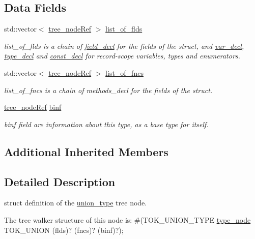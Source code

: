 \subsection*{Data Fields}
\begin{DoxyCompactItemize}
\item 
std\+::vector$<$ \hyperlink{tree__node_8hpp_a6ee377554d1c4871ad66a337eaa67fd5}{tree\+\_\+node\+Ref} $>$ \hyperlink{structunion__type_afc9fabf0aa1ebfbcf0a4d10b7c5c61f0}{list\+\_\+of\+\_\+flds}
\begin{DoxyCompactList}\small\item\em list\+\_\+of\+\_\+flds is a chain of \hyperlink{structfield__decl}{field\+\_\+decl} for the fields of the struct, and \hyperlink{structvar__decl}{var\+\_\+decl}, \hyperlink{structtype__decl}{type\+\_\+decl} and \hyperlink{structconst__decl}{const\+\_\+decl} for record-\/scope variables, types and enumerators. \end{DoxyCompactList}\item 
std\+::vector$<$ \hyperlink{tree__node_8hpp_a6ee377554d1c4871ad66a337eaa67fd5}{tree\+\_\+node\+Ref} $>$ \hyperlink{structunion__type_a9e6fa58f4f221b7eca938388a638e14b}{list\+\_\+of\+\_\+fncs}
\begin{DoxyCompactList}\small\item\em list\+\_\+of\+\_\+fncs is a chain of methods\+\_\+decl for the fields of the struct. \end{DoxyCompactList}\item 
\hyperlink{tree__node_8hpp_a6ee377554d1c4871ad66a337eaa67fd5}{tree\+\_\+node\+Ref} \hyperlink{structunion__type_a9b15f11bc4c65c5f7a34dfee2a01ad1f}{binf}
\begin{DoxyCompactList}\small\item\em binf field are information about this type, as a base type for itself. \end{DoxyCompactList}\end{DoxyCompactItemize}
\subsection*{Additional Inherited Members}


\subsection{Detailed Description}
struct definition of the \hyperlink{structunion__type}{union\+\_\+type} tree node. 

The tree walker structure of this node is\+: \#(T\+O\+K\+\_\+\+U\+N\+I\+O\+N\+\_\+\+T\+Y\+PE \hyperlink{structtype__node}{type\+\_\+node} T\+O\+K\+\_\+\+U\+N\+I\+ON (flds)? (fncs)? (binf)?); 

